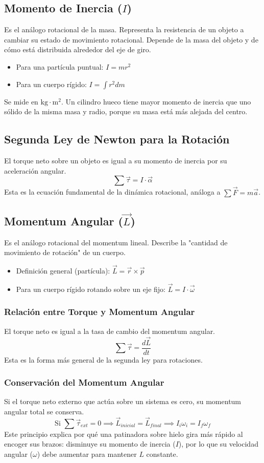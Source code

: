 \documentclass[11pt]{article}
\begin{document}
\subsection{Momento de Inercia ($I$)}
Es el análogo rotacional de la masa. Representa la resistencia de un objeto a cambiar su estado de movimiento rotacional. Depende de la masa del objeto y de cómo está distribuida alrededor del eje de giro.
\begin{itemize}
	\item Para una partícula puntual: $I = m r^2$
	\item Para un cuerpo rígido: $I = \int r^2 dm$
\end{itemize}
Se mide en $\text{kg} \cdot \text{m}^2$. Un cilindro hueco tiene mayor momento de inercia que uno sólido de la misma masa y radio, porque su masa está más alejada del centro.

\subsection{Segunda Ley de Newton para la Rotación}
El torque neto sobre un objeto es igual a su momento de inercia por su aceleración angular.
\[ \sum \vec{\tau} = I \cdot \vec{\alpha} \]
Esta es la ecuación fundamental de la dinámica rotacional, análoga a $\sum \vec{F} = m\vec{a}$.

\subsection{Momentum Angular ($\vec{L}$)}
Es el análogo rotacional del momentum lineal. Describe la "cantidad de movimiento de rotación" de un cuerpo.
\begin{itemize}
	\item Definición general (partícula): $\vec{L} = \vec{r} \times \vec{p}$
	\item Para un cuerpo rígido rotando sobre un eje fijo: $\vec{L} = I \cdot \vec{\omega}$
\end{itemize}

\subsubsection{Relación entre Torque y Momentum Angular}
El torque neto es igual a la tasa de cambio del momentum angular.
\[ \sum \vec{\tau} = \frac{d\vec{L}}{dt} \]
Esta es la forma más general de la segunda ley para rotaciones.

\subsubsection{Conservación del Momentum Angular}
Si el torque neto externo que actúa sobre un sistema es cero, su momentum angular total se conserva.
\[ \text{Si } \sum \vec{\tau}_{ext} = 0 \implies \vec{L}_{inicial} = \vec{L}_{final} \implies I_i \omega_i = I_f \omega_f \]
Este principio explica por qué una patinadora sobre hielo gira más rápido al encoger sus brazos: disminuye su momento de inercia ($I$), por lo que su velocidad angular ($\omega$) debe aumentar para mantener $L$ constante.
\end{document}
